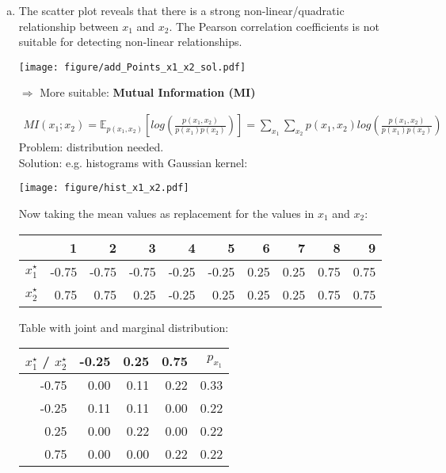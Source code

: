 {\begin{enumerate}[a)]
  \item  The scatter plot reveals that there is a strong non-linear/quadratic relationship between $x_1$ and $x_2$. The Pearson correlation coefficients is not suitable for detecting non-linear relationships.
  
	\begin{center}
	\texttt{[image: figure/add\_Points\_x1\_x2\_sol.pdf]}
	\end{center}

  \item[$\Rightarrow$] More suitable: \textbf{Mutual Information (MI)}
  
  \begin{align*}
  	MI(x_1 ; x_2 ) =  \mathbb{E}_{p(x_1, x_2)} \left[ log\left(\frac{p(x_1, x_2)}{p(x_1) p(x_2)} \right) \right] = \sum_{x_1} \sum_{x_2} p(x_1, x_2) log\left(\frac{p(x_1, x_2)}{p(x_1) p(x_2)} \right)
  \end{align*}
  Problem: distribution needed. \\
  Solution: e.g. histograms with Gaussian kernel:
  \begin{center}
  	\texttt{[image: figure/hist\_x1\_x2.pdf]}
  \end{center}
  Now taking the mean values as replacement for the values in $x_1$ and $x_2$:
  \begin{table}[H]
  	\centering
  	\begin{tabular}{r|rrrrrrrrr}
  		\hline
  		& 1 & 2 & 3 & 4 & 5 & 6 & 7 & 8 & 9 \\ 
  		\hline
  		$x_1^\star$ & -0.75 & -0.75 & -0.75 & -0.25 & -0.25 & 0.25 & 0.25 & 0.75 & 0.75 \\ 
  		$x_2^\star$ & 0.75 & 0.75 & 0.25 & -0.25 & 0.25 & 0.25 & 0.25 & 0.75 & 0.75 \\ 
  		\hline
  	\end{tabular}
  \end{table}  
  Table with joint and marginal distribution: 
  \begin{table}[H]
  	\centering
  	\begin{tabular}{r|rrr|r}
  		\hline
  		$x_1^\star$ / $x_2^\star$& -0.25 & 0.25 & 0.75 & $p_{x_1}$ \\ 
  		\hline
  		-0.75 & 0.00 & 0.11 & 0.22 & 0.33 \\ 
  		-0.25 & 0.11 & 0.11 & 0.00 & 0.22 \\ 
  		0.25 & 0.00 & 0.22 & 0.00 & 0.22 \\ 
  		0.75 & 0.00 & 0.00 & 0.22 & 0.22 \\

\end{tabular}
\end{table}
\end{enumerate}}
